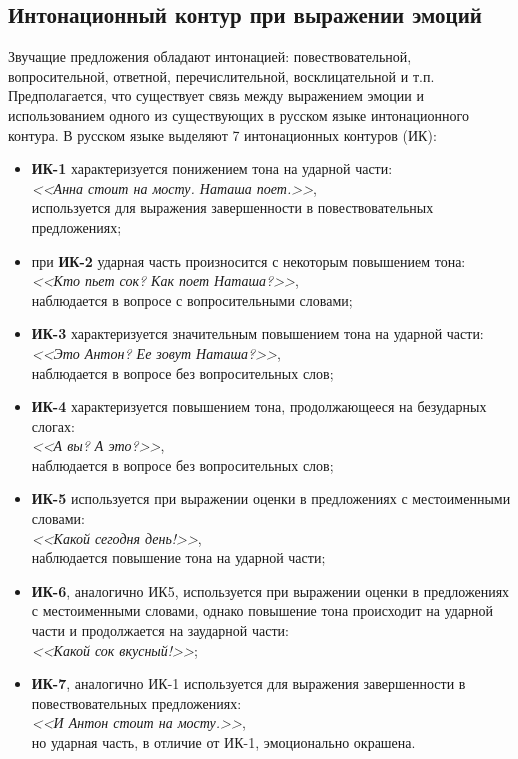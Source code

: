 \subsection{Интонационный контур при выражении эмоций}
Звучащие предложения обладают интонацией: повествовательной, вопросительной, ответной, перечислительной, восклицательной и т.п. Предполагается, что существует связь между выражением эмоции и использованием одного из существующих в русском языке интонационного контура. \cite{intonation} В русском языке выделяют 7 интонационных контуров (ИК): \cite{ik}
\begin{itemize}
	\item \textbf{ИК-1} характеризуется понижением тона на ударной части:\\
	\textit{<<Анна стоит на мосту. Наташа поет.>>},\\
	используется для выражения завершенности в повествовательных предложениях;
	\item при \textbf{ИК-2} ударная часть произносится с некоторым повышением тона:\\
	\textit{<<Кто пьет сок? Как поет Наташа?>>},\\
	наблюдается в вопросе с вопросительными словами;
	\item \textbf{ИК-3} характеризуется значительным повышением тона на ударной части:\\
	\textit{<<Это Антон? Ее зовут Наташа?>>},\\
	наблюдается в вопросе без вопросительных слов;
	\item \textbf{ИК-4} характеризуется повышением тона, продолжающееся на безударных слогах:\\
	\textit{<<А вы? А это?>>},\\
	наблюдается в вопросе без вопросительных слов;
	\item \textbf{ИК-5} используется при выражении оценки в предложениях с местоименными словами:\\
	\textit{<<Какой сегодня день!>>},\\
	наблюдается повышение тона на ударной части;
	\item \textbf{ИК-6}, аналогично ИК5, используется при выражении оценки в предложениях с местоименными словами, однако повышение тона происходит на ударной части и продолжается на заударной части:\\
	\textit{<<Какой сок вкусный!>>};
	\item \textbf{ИК-7}, аналогично ИК-1 используется для выражения завершенности в повествовательных предложениях:\\
	\textit{<<И Антон стоит на мосту.>>},\\
	но ударная часть, в отличие от ИК-1, эмоционально окрашена.
\end{itemize}
